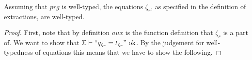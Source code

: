 \begin{lemma}
Assuming that $prg$ is well-typed, the equations $\zeta_r$, as specified in the definition of extractions, are well-typed.

\begin{proof}
First, note that by definition $aux$ is the function definition that $\zeta_r$ is a part of. We want to show that $\Sigma \vdash `` q_{\zeta_r} = t_{\zeta_r} " \textrm{ ok}$. By the judgement for well-typedness of equations this means that we have to show the following.
%
%
%

\end{proof}
\end{lemma}
